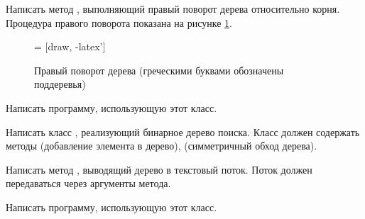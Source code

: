 Написать метод , выполняющий правый поворот дерева
относительно корня. Процедура правого поворота показана на рисунке
\ref{fig:rotate}.

\begin{figure}
  \begin{centering}
     = [draw, -latex']
    \usetikzlibrary{shapes,positioning}
    \par
  \end{centering}

  \caption{Правый поворот дерева (греческими буквами обозначены
    поддеревья)\label{fig:rotate}}
\end{figure}

Написать программу, использующую этот класс.

\task Написать класс , реализующий бинарное дерево
поиска. Класс должен содержать методы  (добавление элемента в
дерево),  (симметричный обход дерева).

Написать метод , выводящий дерево в текстовый поток. Поток
должен передаваться через аргументы метода.

Написать программу, использующую этот класс.

